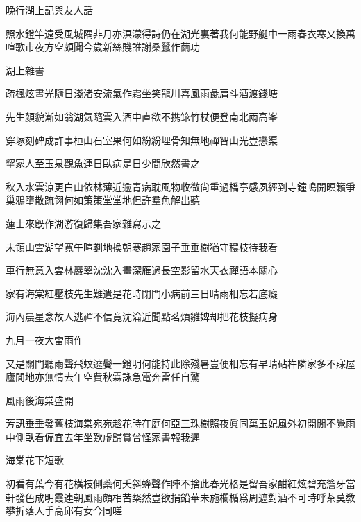 \documentclass{zhvt-classic-Miya}
\begin{document}
\begin{fw}晚行湖上記與友人話\end{fw}

照水鐙竿遠受風城隅非月亦溟濛得詩仍在湖光裏著我何能野艇中一雨春衣寒又換萬喧歌市夜方空頗聞今歲新絲賤誰謝桑蠶作繭功

\begin{fw}湖上雜書\end{fw}

疏楓炫晝光隨日淺渚安流氣作霜坐笑龍川喜風雨彘肩斗酒渡錢塘

先生顏貌漸如翁湖氣隨雲入酒中直欲不携筇竹杖便登南北兩高峯

穿塚刻碑成許事桓山石室果何如紛紛埋骨知無地禪智山光豈戀渠

\begin{fw}挈家人至玉泉觀魚連日臥病是日少間欣然書之\end{fw}

秋入水雲涼更白山依林薄近逾青病耽風物收微尙重過橋亭感夙經到寺鐘鳴開暝籟爭巢鴉墮散䟽翎何如策策堂堂地但許羣魚解出聽

\begin{fw}蓮士來旣作湖游復歸集吾家雜寫示之\end{fw}

未領山雲湖望寬午暄剗地換朝寒趙家園子垂垂樹猶守穠枝待我看

車行無意入雲林巖翠沈沈入畫深雁過長空影留水天衣禪語本關心

家有海棠紅壓枝先生難遣是花時閉門小病前三日晴雨相忘若底癡

海內晨星念故人逃禪不信竟沈淪近聞點茗煩雛婢却把花枝擬病身

\begin{fw}九月一夜大雷雨作\end{fw}

又是關門聽雨聲飛蚊遶鬢一鐙明何能持此除殘暑豈便相忘有早晴砧杵隣家多不寐屋廬閒地亦無情去年空費秋霖詠急電奔雷任自驚

\begin{fw}風雨後海棠盛開\end{fw}

芳訊垂垂發舊枝海棠宛宛趁花時在庭何亞三珠樹照夜眞同萬玉妃風外初開閒不覺雨中側臥看偏宜去年坐歎虛歸賞曾怪家書報我遲

\begin{fw}海棠花下短歌\end{fw}

初看有葉今有花橫枝側蘂何夭斜蜂聲作陣不捨此春光格是留吾家酣紅炫碧充簷牙當軒發色成明霞連朝風雨頗相苦粲然豈欲捐鉛華未施欄楯爲周遮對酒不可時呼茶莫敎攀折落人手高邱有女今同嗟
\end{document}
